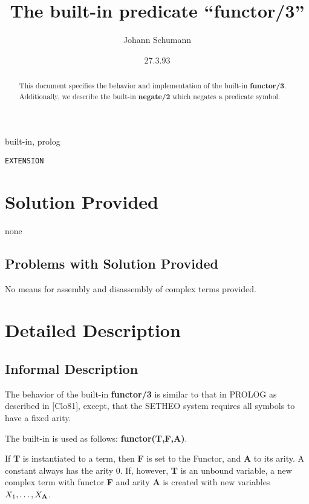 

\title{The built-in predicate ``functor/3''}
\author{Johann Schumann}
\date{27.3.93}



\maketitle

\begin{abstract}
This document specifies the behavior and implementation of the built-in
{\bf functor/3}.
Additionally, we describe the built-in {\bf negate/2} which negates
a predicate symbol.

\end{abstract}

  built-in, prolog

 {\tt EXTENSION}

\section{Solution Provided}

none

\subsection{Problems with Solution Provided}
	
No means for assembly and disassembly of complex terms provided.


\section{Detailed Description}

\subsection{Informal Description}

The behavior of the built-in {\bf functor/3} is similar to that
in PROLOG as described in [Clo81], except, that the SETHEO system
requires all symbols to have a fixed arity.

The built-in is used as follows: {\bf functor(T,F,A)}.

If {\bf T} is instantiated to a term, then {\bf F} is set to the
Functor, and {\bf A} to its arity. A constant always has the arity $0$.
%
If, however, {\bf T} is an unbound variable, a new complex term
with functor {\bf F} and arity {\bf A} is created with new variables
$X_1, \ldots, X_{\bf A}$.


